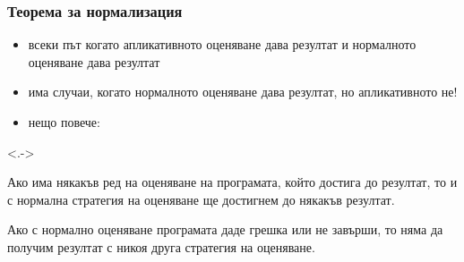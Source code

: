 \documentclass{beamer}
\begin{document}
\begin{frame}
  \frametitle{Теорема за нормализация}
  \begin{itemize}[<+->]
  \item всеки път когато апликативното оценяване дава резултат и нормалното оценяване дава резултат
  \item има случаи, когато нормалното оценяване дава резултат, но апликативното не!
  \item нещо повече:
  \end{itemize}
  \onslide<.->
  \begin{theorem}
    Ако има някакъв ред на оценяване на програмата, който достига до резултат, то и с нормална стратегия на оценяване ще достигнем до някакъв резултат.
  \end{theorem}
  \onslide<+->
  \begin{corollary}
    Ако с нормално оценяване програмата даде грешка или не завърши, то няма да получим резултат с \alert{никоя друга стратегия на оценяване}.
  \end{corollary}
\end{frame}
\end{document}
